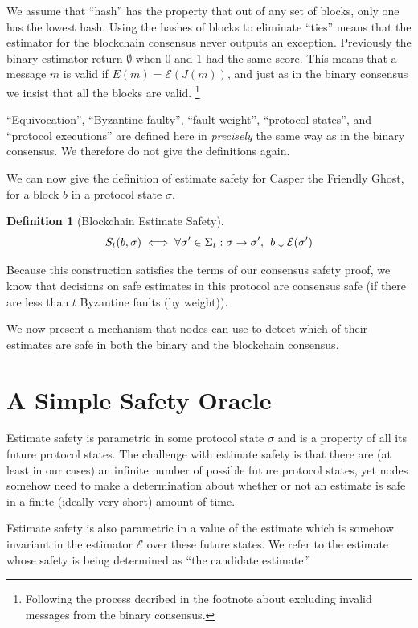 \documentclass{article}
\theoremstyle{definition}
\newtheorem{defn}{Definition}[section]
\begin{document}
We assume that ``hash'' has the property that out of any set of blocks, only one has the lowest hash. Using the hashes of blocks to eliminate ``ties'' means that the estimator for the blockchain consensus never outputs an exception. Previously the binary estimator return $\emptyset$ when $0$ and $1$ had the same score. This means that a message $m$ is valid if $E(m) = \mathcal{E}(J(m))$, and just as in the binary consensus we insist that all the blocks are valid. \footnote{Following the process decribed in the footnote about excluding invalid messages from the binary consensus.}

``Equivocation'', ``Byzantine faulty'', ``fault weight'', ``protocol states'', and ``protocol executions'' are defined here in \emph{precisely} the same way as in the binary consensus. We therefore do not give the definitions again.

We can now give the definition of estimate safety for Casper the Friendly Ghost, for a block $b$ in a protocol state $\sigma$.

\begin{defn}[Blockchain Estimate Safety]
$$
S_t(b, \sigma) \iff \forall \sigma' \in \Sigma_t: \sigma \to \sigma',\hspace{1.5mm} b \downarrow \mathcal{E}(\sigma')
$$
\end{defn}

Because this construction satisfies the terms of our consensus safety proof, we know that decisions on safe estimates in this protocol are consensus safe (if there are less than $t$ Byzantine faults (by weight)).

We now present a mechanism that nodes can use to detect which of their estimates are safe in both the binary and the blockchain consensus.

\section{A Simple Safety Oracle}

Estimate safety is parametric in some protocol state $\sigma$ and is a property of all its future protocol states. The challenge with estimate safety is that there are (at least in our cases) an infinite number of possible future protocol states, yet nodes somehow need to make a determination about whether or not an estimate is safe in a finite (ideally very short) amount of time.

Estimate safety is also parametric in a value of the estimate which is somehow invariant in the estimator $\mathcal{E}$ over these future states. We refer to the estimate whose safety is being determined as ``the candidate estimate.''
\end{document}
